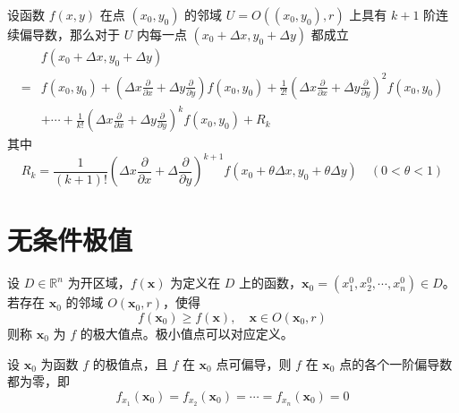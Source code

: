 \documentclass{ctexbook}
\begin{document}
\begin{theorem}[多元函数的Taylor公式]
    设函数 $f(x,y)$ 在点 $(x_0,y_0)$ 的邻域 $U=O((x_0,y_0),r)$ 上具有 $k+1$ 阶连续偏导数，那么对于 $U$ 内每一点 $(x_0+\Delta x,y_0+\Delta y)$ 都成立
    \begin{equation}
        \begin{aligned}
            &f(x_0+\Delta x,y_0+\Delta y)\\
           =&f(x_0,y_0)+\left(\Delta x\frac{\partial}{\partial x}+\Delta y\frac{\partial}{\partial y}\right)f(x_0,y_0)+\frac{1}{2!}\left(\Delta x\frac{\partial}{\partial x}+\Delta y\frac{\partial}{\partial y}\right)^2f(x_0,y_0)\\
           &+\cdots+\frac{1}{k!}\left(\Delta x\frac{\partial}{\partial x}+\Delta y\frac{\partial}{\partial y}\right)^k f(x_0,y_0)+R_k
        \end{aligned}
    \end{equation}
    其中
    \begin{equation}
        R_k=\frac{1}{(k+1)!}\left(\Delta x\frac{\partial}{\partial x}+\Delta \frac{\partial}{\partial y}\right)^{k+1}f(x_0+\theta\Delta x,y_0+\theta\Delta y) \quad (0<\theta<1)
    \end{equation}
\end{theorem}

\section{无条件极值}

\begin{definition}[无条件极值]
    设 $D\in\mathbb{R}^n$ 为开区域，$f(\boldsymbol{x})$ 为定义在 $D$ 上的函数，$\boldsymbol{x}_0=(x_1^0,x_2^0,\cdots,x_n^0)\in D$。若存在 $\boldsymbol{x}_0$ 的邻域 $O(\boldsymbol{x}_0,r)$，使得
    \begin{equation}
        f(\boldsymbol{x}_0)\geq f(\boldsymbol{x}),\quad\boldsymbol{x}\in O(\boldsymbol{x}_0,r)
    \end{equation}
    则称 $\boldsymbol{x}_0$ 为 $f$ 的极大值点。极小值点可以对应定义。
\end{definition}

\begin{theorem}[无条件极值必要条件]
    设 $\boldsymbol{x}_0$ 为函数 $f$ 的极值点，且 $f$ 在 $\boldsymbol{x}_0$ 点可偏导，则 $f$ 在 $\boldsymbol{x}_0$ 点的各个一阶偏导数都为零，即
    \begin{equation}
        f_{x_1}(\boldsymbol{x}_0)=f_{x_2}(\boldsymbol{x}_0)=\cdots=f_{x_n}(\boldsymbol{x}_0)=0
    \end{equation}
\end{theorem}
\end{document}
